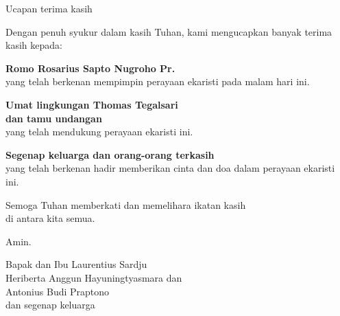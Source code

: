 \documentclass[12pt,twoside]{book}
\newcommand{\keluarga}{Laurentius Sardju\xspace}
\newcommand{\calonibu}{Heriberta Anggun Hayuningtyasmara\xspace}
\newcommand{\calonayah}{Antonius Budi Praptono\xspace}
\newcommand{\romo}{Rosarius Sapto Nugroho Pr.\xspace}
\newcommand{\lingkungan}{Thomas Tegalsari\xspace}
\begin{document}
\newpage
\begin{flushright}
{\Large Ucapan terima kasih}

\noindent Dengan penuh syukur dalam kasih Tuhan, kami mengucapkan banyak
terima kasih kepada:

\textbf{Romo \romo}\\
yang telah berkenan mempimpin perayaan ekaristi pada malam hari ini.

\textbf{Umat lingkungan \lingkungan\\ dan tamu undangan}\\
yang telah mendukung perayaan ekaristi ini.

\textbf{Segenap keluarga dan orang-orang terkasih}\\
yang telah berkenan hadir memberikan cinta dan doa dalam perayaan
ekaristi ini.

Semoga Tuhan memberkati dan memelihara ikatan kasih\\ di antara kita semua.

Amin.

\bigskip 

\small
Bapak dan Ibu \keluarga\\
\calonibu dan\\ \calonayah\\
dan segenap keluarga
\end{flushright}
\end{document}
